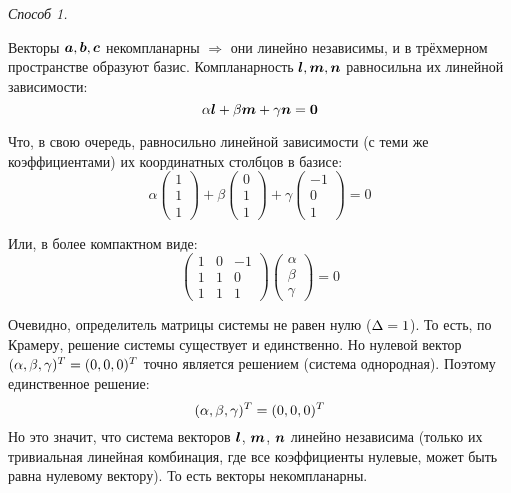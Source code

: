 \documentclass[a4paper,12pt]{article}
\begin{document}
  \begin{solution}
    \vphantom{}\par
    
    \emph{Способ 1.}
    
    \medskip
    
    Векторы $\boldsymbol a, \boldsymbol b, \boldsymbol c$ некомпланарны $\Rightarrow$ они линейно независимы, и в трёхмерном пространстве образуют базис.
    Компланарность $\boldsymbol l, \boldsymbol m, \boldsymbol n$ равносильна их линейной зависимости:
    \[
      \alpha \boldsymbol l + \beta \boldsymbol m + \gamma \boldsymbol n = \boldsymbol 0
    \]
    
    Что, в свою очередь, равносильно линейной зависимости (с теми же коэффициентами) их координатных столбцов в базисе:
    \[
      \alpha \begin{pmatrix}
        1 \\ 1 \\ 1
      \end{pmatrix}
      + \beta \begin{pmatrix}
        0 \\ 1 \\ 1
      \end{pmatrix}
      + \gamma \begin{pmatrix}
        -1 \\ 0 \\ 1
      \end{pmatrix}
      = 0
    \]
    
    Или, в более компактном виде:
    \[
      \begin{pmatrix}
        1 & 0 & -1\\
        1 & 1 & 0\\
        1 & 1 & 1
      \end{pmatrix}
      \begin{pmatrix}
        \alpha \\ \beta \\ \gamma
      \end{pmatrix}
      = 0
    \]
    
    Очевидно, определитель матрицы системы не равен нулю ($\Delta \hm= 1$).
    То есть, по Крамеру, решение системы существует и единственно.
    Но нулевой вектор $(\alpha, \beta, \gamma)^T \hm= (0, 0, 0)^T$ точно является решением (система однородная).
    Поэтому единственное решение:
    \[
      (\alpha, \beta, \gamma)^T \hm= (0, 0, 0)^T
    \]
    Но это значит, что система векторов $\boldsymbol l$, $\boldsymbol m$, $\boldsymbol n$ линейно независима (только их тривиальная линейная комбинация, где все коэффициенты нулевые, может быть равна нулевому вектору).
    То есть векторы некомпланарны.
    

\end{solution}
\end{document}

